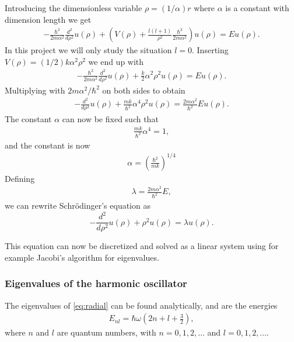 \documentclass[11pt,a4paper,english,final]{article}
\numberwithin{equation}{section}
\begin{document}
Introducing the dimensionless variable $\rho = (1/\alpha) r$
where $\alpha$ is a constant with dimension length we get
\begin{gather}
  -\frac{\hbar^2}{2 m \alpha^2} \frac{d^2}{d\rho^2} u(\rho) 
       + \left ( V(\rho) + \frac{l (l + 1)}{\rho^2}
         \frac{\hbar^2}{2 m\alpha^2} \right ) u(\rho)  = E u(\rho) .
\end{gather}
In this project we will only study the situation $l=0$.
Inserting $V(\rho) = (1/2) k \alpha^2\rho^2$ we end up with
\begin{gather}
  -\frac{\hbar^2}{2 m \alpha^2} \frac{d^2}{d\rho^2} u(\rho) 
       + \frac{k}{2} \alpha^2\rho^2u(\rho)  = E u(\rho) .
\end{gather}
Multiplying with $2m\alpha^2/\hbar^2$ on both sides to obtain
\begin{gather}
  -\frac{d^2}{d\rho^2} u(\rho) 
       + \frac{mk}{\hbar^2} \alpha^4\rho^2u(\rho) 
       = \frac{2m\alpha^2}{\hbar^2}E u(\rho) .
\end{gather}
The constant $\alpha$ can now be fixed such that
\begin{gather}
\frac{mk}{\hbar^2} \alpha^4 = 1,
\end{gather}
and the constant is now
\begin{gather}
\alpha = \left(\frac{\hbar^2}{mk}\right)^{1/4}
\end{gather}
Defining 
\begin{gather}
\lambda = \frac{2m\alpha^2}{\hbar^2}E,
\end{gather}
we can rewrite Schrödinger's equation as
\begin{equation}
  -\frac{d^2}{d\rho^2} u(\rho) + \rho^2u(\rho)  = \lambda u(\rho) .
\end{equation}

This equation can now be discretized and solved as a linear system 
using for example Jacobi's algorithm for eigenvalues. 

\subsubsection{Eigenvalues of the harmonic oscillator}
The eigenvalues of \eqref{eq:radial} can be found analytically,
and are the energies
\begin{gather}
E_{nl}=  \hbar \omega \left(2n+l+\frac{3}{2}\right),
\end{gather}
where $n$ and $l$ are quantum numbers, with $n = 0, 1, 2, \dots$ and
$l = 0, 1, 2,  \dots $.
 
\end{document}
